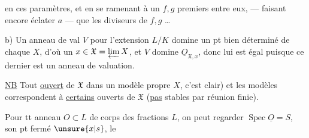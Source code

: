 en ces paramètres, et en se ramenant à un $f,g$ premiers entre eux,  --- faisant encore éclater $a$ --- que les diviseurs de $f,g$  \ldots

b) Un anneau de val $V$  pour l'extension $L/K$ domine un pt bien déterminé de chaque $X$, d'où un $x\in\mathfrak X=\varprojlim X$, et $V$ domine $\underline{O}_{\mathfrak X,x}$, donc lui est égal puisque ce dernier est un anneau de valuation.

\uline{NB} Tout  \uline{ouvert} de $\mathfrak X$    dans un modèle propre $X$, c'est clair) et  les modèles correspondent à \uline{certains} ouverts de $\mathfrak X$ (\uline{pas} stables par réunion finie).

Pour tt anneau   $O\subset L$ de corps des fractions $L$, on peut regarder $\operatorname{Spec}\underline{O}=S$, son pt fermé $\unsure{x|s}$, le 
